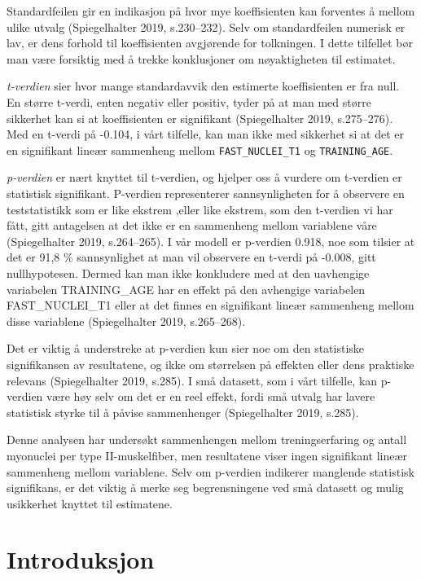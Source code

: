 \documentclass[
  letterpaper,
  DIV=11,
  numbers=noendperiod]{scrreprt}
\begin{document}
Standardfeilen gir en indikasjon på hvor mye koeffisienten kan forventes
å mellom ulike utvalg (Spiegelhalter 2019, s.230--232). Selv om
standardfeilen numerisk er lav, er dens forhold til koeffisienten
avgjørende for tolkningen. I dette tilfellet bør man være forsiktig med
å trekke konklusjoner om nøyaktigheten til estimatet.

\emph{t-verdien} sier hvor mange standardavvik den estimerte
koeffisienten er fra null. En større t-verdi, enten negativ eller
positiv, tyder på at man med større sikkerhet kan si at koeffisienten er
signifikant (Spiegelhalter 2019, s.275--276). Med en t-verdi på -0.104,
i vårt tilfelle, kan man ikke med sikkerhet si at det er en signifikant
lineær sammenheng mellom \texttt{FAST\_NUCLEI\_T1} og
\texttt{TRAINING\_AGE}.

\emph{p-verdien} er nært knyttet til t-verdien, og hjelper oss å vurdere
om t-verdien er statistisk signifikant. P-verdien representerer
sannsynligheten for å observere en teststatistikk som er like ekstrem
,eller like ekstrem, som den t-verdien vi har fått, gitt antagelsen at
det ikke er en sammenheng mellom variablene våre (Spiegelhalter 2019,
s.264--265). I vår modell er p-verdien 0.918, noe som tilsier at det er
91,8 \% sannsynlighet at man vil observere en t-verdi på -0.008, gitt
nullhypotesen. Dermed kan man ikke konkludere med at den uavhengige
variabelen TRAINING\_AGE har en effekt på den avhengige variabelen
FAST\_NUCLEI\_T1 eller at det finnes en signifikant lineær sammenheng
mellom disse variablene (Spiegelhalter 2019, s.265--268).

Det er viktig å understreke at p-verdien kun sier noe om den statistiske
signifikansen av resultatene, og ikke om størrelsen på effekten eller
dens praktiske relevans (Spiegelhalter 2019, s.285). I små datasett, som
i vårt tilfelle, kan p-verdien være høy selv om det er en reel effekt,
fordi små utvalg har lavere statistisk styrke til å påvise sammenhenger
(Spiegelhalter 2019, s.285).

Denne analysen har undersøkt sammenhengen mellom treningserfaring og
antall myonuclei per type II-muskelfiber, men resultatene viser ingen
signifikant lineær sammenheng mellom variablene. Selv om p-verdien
indikerer manglende statistisk signifikans, er det viktig å merke seg
begrensningene ved små datasett og mulig usikkerhet knyttet til
estimatene.


\chapter{Introduksjon}\label{introduksjon-4}
\end{document}
